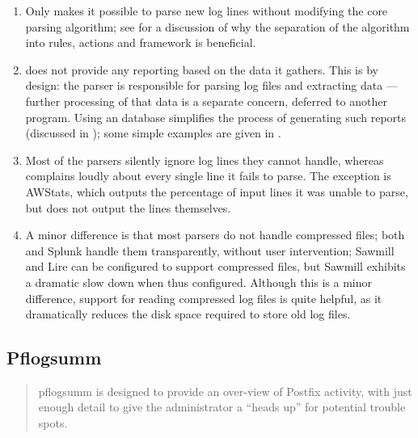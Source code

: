 \begin{enumerate}

    \item Only \parsername{} makes it possible to parse new log lines
        without modifying the core parsing algorithm; see  for a discussion of why the
        separation of the algorithm into rules, actions and framework is
        beneficial.

    \item \parsername{} does not provide any reporting based on the data it
        gathers.  This is by design: the parser is responsible for parsing
        log files and extracting data --- further processing of that data
        is a separate concern, deferred to another program.  Using an
        \SQL{} database simplifies the process of generating such reports
        (discussed in ); some simple examples
        are given in .

    \item Most of the parsers silently ignore log lines they cannot handle,
        whereas \parsername{} complains loudly about every single line it
        fails to parse.  The exception is AWStats, which outputs the
        percentage of input lines it was unable to parse, but does not
        output the lines themselves.

    \item A minor difference is that most parsers do not handle compressed
        files; both \parsername{} and Splunk handle them transparently,
        without user intervention; Sawmill and Lire can be configured to
        support compressed files, but Sawmill exhibits a dramatic slow down
        when thus configured.  Although this is a minor difference, support
        for reading compressed log files is quite helpful, as it
        dramatically reduces the disk space required to store old log
        files.

\end{enumerate}

\subsection{Pflogsumm}

\begin{quotation}

    pflogsumm is designed to provide an over-view of Postfix activity, with
    just enough detail to give the administrator a ``heads up'' for
    potential trouble spots.

\end{quotation}

